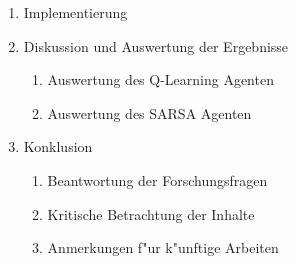 \begin{enumerate}
\begin{enumerate}
        \end{enumerate}
    \item Implementierung
    \item Diskussion und Auswertung der Ergebnisse
        \begin{enumerate}
        \item Auswertung des Q-Learning Agenten
        \item Auswertung des SARSA Agenten
        \end{enumerate}
    \item Konklusion
        \begin{enumerate}
        \item Beantwortung der Forschungsfragen
        \item Kritische Betrachtung der Inhalte
        \item Anmerkungen f"ur k"unftige Arbeiten
        \end{enumerate}   
\end{enumerate}

